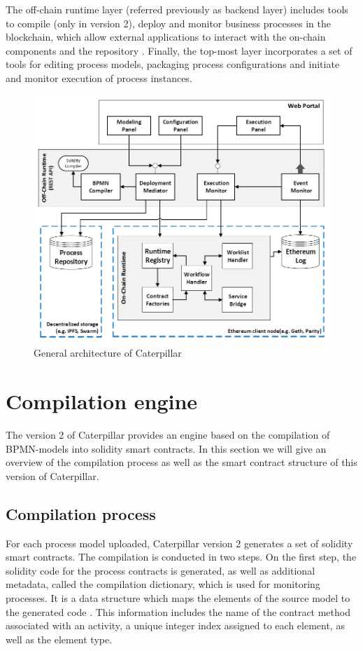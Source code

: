 The off-chain runtime layer (referred previously as backend layer) includes tools to compile (only in version 2), deploy and monitor business processes in the blockchain, which allow external applications to interact with the on-chain components and the repository \cite{caterpillar}. Finally, the top-most layer incorporates a set of tools for editing process models, packaging process configurations and initiate and monitor execution of process instances.

\begin{figure}[hbt]
	\includegraphics[width=\textwidth]{gfx/caterpillar-architecture}
	\caption{General architecture of Caterpillar}
	\label{fig:caterpillar:overview:architecture}
\end{figure}

\section{Compilation engine}
\label{sec:caterpillar:v2}

The version 2 of Caterpillar provides an engine based on the compilation of BPMN-models into solidity smart contracts. In this section we will give an overview of the compilation process as well as the smart contract structure of this version of Caterpillar.

\subsection{Compilation process}
\label{sec:caterpillar:v2:compilation}
For each process model uploaded, Caterpillar version 2 generates a set of solidity smart contracts. The compilation is conducted in two steps. On the first step, the solidity code for the process contracts is generated, as well as additional metadata, called the compilation dictionary, which is used for monitoring processes. It is a data structure which maps the elements of the source model to the generated code \cite{caterpillar}. This information includes the name of the contract method associated with an activity, a unique integer index assigned to each element, as well as the element type.

